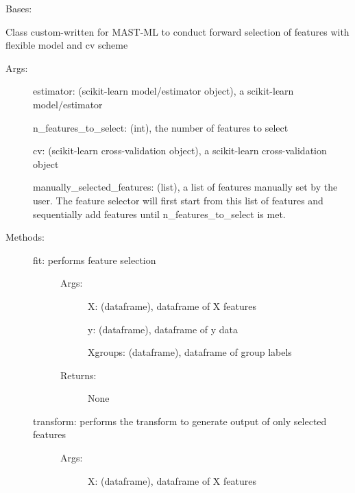 \documentclass[letterpaper,10pt,english]{sphinxmanual}
\begin{document}
\begin{fulllineitems}
\label{\detokenize{api/mastml.feature_selectors.MASTMLFeatureSelector:mastml.feature_selectors.MASTMLFeatureSelector}}
Bases: {\hyperref[\detokenize{api/mastml.feature_selectors.BaseSelector:mastml.feature_selectors.BaseSelector}]{}}

Class custom-written for MAST-ML to conduct forward selection of features with flexible model and cv scheme
\begin{description}
\item[{Args:}] \leavevmode
estimator: (scikit-learn model/estimator object), a scikit-learn model/estimator

n\_features\_to\_select: (int), the number of features to select

cv: (scikit-learn cross-validation object), a scikit-learn cross-validation object

manually\_selected\_features: (list), a list of features manually set by the user. The feature selector will
first start from this list of features and sequentially add features until n\_features\_to\_select is met.

\item[{Methods:}] \leavevmode\begin{description}
\item[{fit: performs feature selection}] \leavevmode\begin{description}
\item[{Args:}] \leavevmode
X: (dataframe), dataframe of X features

y: (dataframe), dataframe of y data

Xgroups: (dataframe), dataframe of group labels

\item[{Returns:}] \leavevmode
None

\end{description}

\item[{transform: performs the transform to generate output of only selected features}] \leavevmode\begin{description}
\item[{Args:}] \leavevmode
X: (dataframe), dataframe of X features


\end{description}
\end{description}
\end{description}
\end{fulllineitems}
\end{document}
